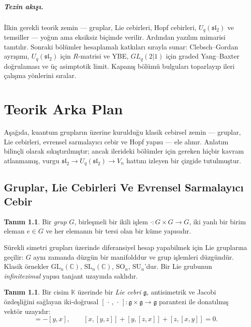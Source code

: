 \documentclass[12pt,a4paper,fleqn]{report}
\newcommand{\normalsemi}{;}
\newcommand{\normalsemi}{\begingroup\semicolonfont;\endgroup}
\numberwithin{equation}{chapter}
\theoremstyle{plain}
\theoremstyle{definition}
\newtheorem{definition}[theorem]{Tanım}
\renewcommand{\sl}{\mathfrak{sl}}
\newcommand{\gfrak}{\mathfrak{g}}
\newcommand{\Uq}{U_q(\sl_2)}
\newcommand{\K}{\mathbb{K}}
\newcommand{\C}{\mathbb{C}}
\newcommand{\GL}{\mathrm{GL}}
\newcommand{\SL}{\mathrm{SL}}
\begin{document}
\paragraph{Tezin akışı.} İlkin gerekli teorik zemin --- gruplar, Lie
cebirleri, Hopf cebirleri, $\Uq$ ve temsiller --- yoğun ama eksiksiz biçimde
verilir. Ardından yazılım mimarisi tanıtılır. Sonraki bölümler hesaplamalı
katkıları sırayla sunar: Clebsch--Gordan ayrışımı, $\Uq$ için $R$-matrisi ve
YBE, $GL_q(2|1)$ için graded Yang--Baxter doğrulaması ve üç asimptotik limit.
Kapanış bölümü bulguları toparlayıp ileri çalışma yönlerini sıralar.

\chapter{Teorik Arka Plan}

Aşağıda, kuantum grupların üzerine kurulduğu klasik cebirsel zemin --- gruplar,
Lie cebirleri, evrensel sarmalayıcı cebir ve Hopf yapısı --- ele alınır.
Anlatım bilinçli olarak sıkıştırılmıştır\normalsemi{} ancak ilerideki bölümler için gereken
hiçbir kavram atlanmamış, vurgu $\sl_2 \to \Uq \to V_n$ hattını izleyen bir
çizgide tutulmuştur.

\section{Gruplar, Lie Cebirleri Ve Evrensel Sarmalayıcı Cebir}

\begin{definition}
Bir \emph{grup} $G$, birleşmeli bir ikili işlem $\cdot : G \times G \to G$,
iki yanlı bir birim eleman $e \in G$ ve her elemanın bir tersi olan bir
küme yapısıdır.
\end{definition}

Sürekli simetri grupları üzerinde diferansiyel hesap yapabilmek için Lie
gruplarına geçilir: $G$ aynı zamanda düzgün bir manifolddur ve grup
işlemleri düzgündür. Klasik örnekler $\GL_n(\C)$, $\SL_n(\C)$,
$\mathrm{SO}_n$, $\mathrm{SU}_n$'dur. Bir Lie grubunun \emph{infinitezimal}
yapısı tanjant uzayında saklıdır.

\begin{definition}
Bir cisim $\K$ üzerinde bir \emph{Lie cebri} $\gfrak$, antisimetrik ve Jacobi
özdeşliğini sağlayan iki-doğrusal $[\,\cdot\,,\,\cdot\,] : \gfrak \times \gfrak \to \gfrak$
parantezi ile donatılmış vektör uzayıdır:
\begin{equation}
  [x,y] = -[y,x], \qquad
  [x,[y,z]] + [y,[z,x]] + [z,[x,y]] = 0.
\end{equation}
\end{definition}
\end{document}
